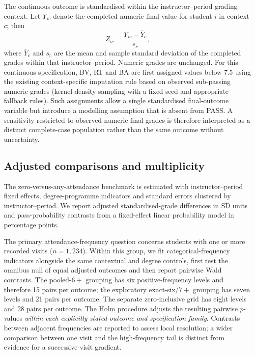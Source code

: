 The continuous outcome is standardised within the instructor--period grading context. Let $Y_{ic}$ denote the completed numeric final value for student $i$ in context $c$; then
\begin{equation}
Z_{ic}=\frac{Y_{ic}-\overline{Y}_c}{s_c},
\end{equation}
where $\overline{Y}_c$ and $s_c$ are the mean and sample standard deviation of the completed grades within that instructor--period. Numeric grades are unchanged. For this continuous specification, BV, RT and BA are first assigned values below 7.5 using the existing context-specific imputation rule based on observed sub-passing numeric grades (kernel-density sampling with a fixed seed and appropriate fallback rules). Such assignments allow a single standardised final-outcome variable but introduce a modelling assumption that is absent from PASS. A sensitivity restricted to observed numeric final grades is therefore interpreted as a distinct complete-case population rather than the same outcome without uncertainty.

\subsection{Adjusted comparisons and multiplicity}

The zero-versus-any-attendance benchmark is estimated with instructor--period fixed effects, degree-programme indicators and standard errors clustered by instructor--period. We report adjusted standardised-grade differences in SD units and pass-probability contrasts from a fixed-effect linear probability model in percentage points.

The primary attendance-frequency question concerns students with one or more recorded visits ($n=1,234$). Within this group, we fit categorical-frequency indicators alongside the same contextual and degree controls, first test the omnibus null of equal adjusted outcomes and then report pairwise Wald contrasts. The pooled-$6+$ grouping has six positive-frequency levels and therefore 15 pairs per outcome; the exploratory exact-six/$7+$ grouping has seven levels and 21 pairs per outcome. The separate zero-inclusive grid has eight levels and 28 pairs per outcome. The Holm procedure adjusts the resulting pairwise $p$-values \emph{within each explicitly stated outcome and specification family}. Contrasts between adjacent frequencies are reported to assess local resolution; a wider comparison between one visit and the high-frequency tail is distinct from evidence for a successive-visit gradient.

